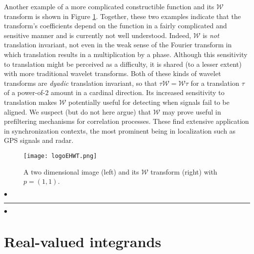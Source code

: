 \documentclass{psapm-l}
\theoremstyle{definition}
\theoremstyle{remark}
\numberwithin{equation}{section}
\begin{document}
Another example of a more complicated constructible function and its ${{\mathcal W}}$ transform is shown in Figure \ref{fig:logoehwt}.  Together, these two examples indicate that the transform's coefficients depend on the function in a fairly complicated and sensitive manner and is currently not well understood. Indeed, ${{\mathcal W}}$ is {\it not} translation invariant, not even in the weak sense of the Fourier transform in which translation results in a multiplication by a phase. Although this sensitivity to translation might be perceived as a difficulty, it is shared (to a lesser extent) with more traditional wavelet transforms.  Both of these kinds of wavelet transforms are {\it dyadic} translation invariant, so that $\tau {{\mathcal W}}={{\mathcal W}} \tau$ for a translation $\tau$ of a power-of-$2$ amount in a cardinal direction.  Its increased sensitivity to translation makes ${{\mathcal W}}$ potentially useful for detecting when signals fail to be aligned.  We suspect (but do not here argue) that ${{\mathcal W}}$ may prove useful in prefiltering mechanisms for correlation processes.  These find extensive application in synchronization contexts, the most prominent being in localization such as GPS signals and radar.
\begin{figure}[hbt]
  \begin{center}
       \texttt{[image: logoEHWT.png]}
  \end{center}
  \caption{A two dimensional image (left) and its ${{\mathcal W}}$ transform (right) with $p=(1,1)$.}
  \label{fig:logoehwt}
\end{figure}

{
\begin{center}
\nointerlineskip\vspace{-0.04in}
        $\bullet$\hfill\rule{0.77\linewidth}{1.0pt}\hfill$\bullet$
\par\nointerlineskip\vspace{-0.01in}
\end{center}
}
\vspace{0.1in}

\section{Real-valued integrands}
\label{sec:Rval}
\end{document}
